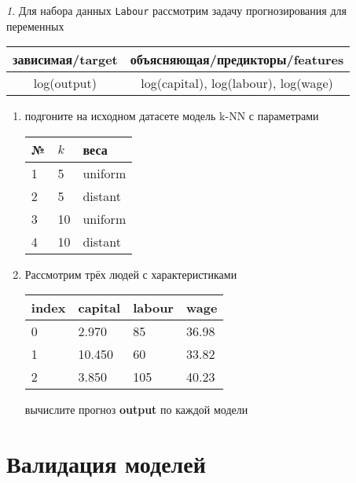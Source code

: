 \documentclass[12pt]{article}
\theoremstyle{remark}
\newtheorem{exercise}{}[section]
\begin{document}
\begin{exercise}
Для набора данных \texttt{Labour} рассмотрим задачу прогнозирования
для переменных
\begin{center}
	\begin{tabular}{|c|c|}\hline
		зависимая/target & объясняющая/предикторы/features \\ \hline
		log(output) & log(capital), log(labour), log(wage) \\ \hline
	\end{tabular}
\end{center}
\begin{enumerate}
	\item подгоните на исходном датасете модель k-NN с параметрами
	\begin{center}
		\begin{tabular}{|l|l|l|}\hline
		№ & \(k\) & веса \\ \hline
		1 & 5 & uniform \\
		2 & 5 & distant \\
		3 & 10 & uniform \\
		4 & 10 & distant \\ \hline
		\end{tabular}
	\end{center}
	\item Рассмотрим трёх людей с характеристиками
	\begin{center}
		\begin{tabular}{|l||l|l|l|}\hline
			index & capital & labour & wage \\ \hline\hline
			0 & 2.970 & 85 & 36.98\\
			1 & 10.450 & 60 & 33.82  \\
			2 & 3.850 & 105 & 40.23\\ \hline
		\end{tabular}
	\end{center}
	вычислите прогноз \textbf{output} по каждой модели
\end{enumerate}
\end{exercise}


\section{Валидация моделей}
\end{document}
